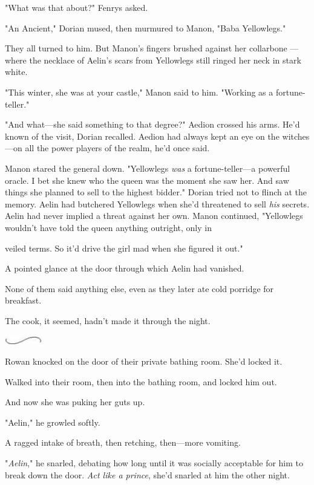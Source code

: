 "What was that about?" Fenrys asked.

"An Ancient," Dorian mused, then murmured to Manon, "Baba Yellowlegs."

They all turned to him. But Manon's fingers brushed against her collarbone ---where the necklace of Aelin's scars from Yellowlegs still ringed her neck in stark white.

"This winter, she was at your castle," Manon said to him. "Working as a fortune-teller."

"And what---she said something to that degree?" Aedion crossed his arms. He'd known of the visit, Dorian recalled. Aedion had always kept an eye on the witches---on all the power players of the realm, he'd once said.

Manon stared the general down. "Yellowlegs \emph{was} a fortune-teller---a powerful oracle. I bet she knew who the queen was the moment she saw her. And saw things she planned to sell to the highest bidder." Dorian tried not to flinch at the memory. Aelin had butchered Yellowlegs when she'd threatened to sell \emph{his} secrets. Aelin had never implied a threat against her own. Manon continued, "Yellowlegs wouldn't have told the queen anything outright, only in

veiled terms. So it'd drive the girl mad when she figured it out."

A pointed glance at the door through which Aelin had vanished.

None of them said anything else, even as they later ate cold porridge for breakfast.

The cook, it seemed, hadn't made it through the night.

\includegraphics[width=0.65in,height=0.13in]{images/seperator}

Rowan knocked on the door of their private bathing room. She'd locked it.

Walked into their room, then into the bathing room, and locked him out.

And now she was puking her guts up.

"Aelin," he growled softly.

A ragged intake of breath, then retching, then---more vomiting.

"\emph{Aelin}," he snarled, debating how long until it was socially acceptable for him to break down the door. \emph{Act like a prince}, she'd snarled at him the other night.

